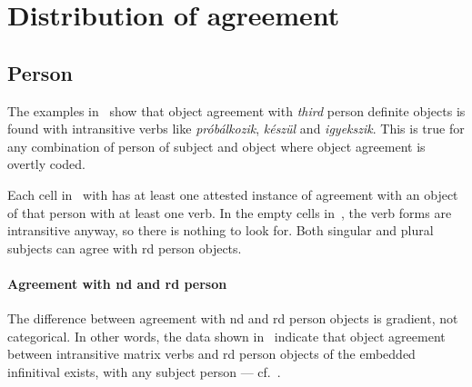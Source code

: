 \section{Distribution of agreement}\label{sec:distribution-of-agreement}

\subsection{Person}

The examples in~ show that object agreement with \emph{third}
person definite objects is found with intransitive verbs like
\emph{próbálkozik}, \emph{készül} and \emph{igyekszik}. This is true for any
combination of person of subject and object where object agreement is overtly
coded.

Each cell in~ with  has at least one attested
instance of agreement with an object of that person with at least one verb.  In
the empty cells in~, the verb forms are intransitive anyway,
so there is nothing to look for. Both singular and plural subjects can agree
with \Third{}rd person objects.

\paragraph{Agreement with \Second{}nd and \Third{}rd person}

The difference between agreement with \Second{}nd and \Third{}rd person objects
is gradient, not categorical. In other words, the data shown in~
indicate that object agreement between intransitive matrix verbs and \Third{}rd
person objects of the embedded infinitival exists, with any subject person ---
cf.~.

